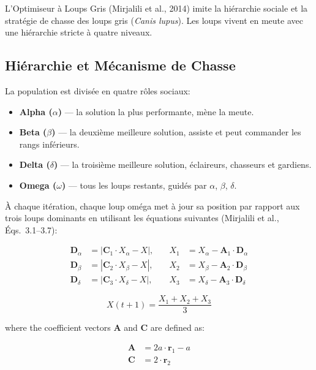\documentclass[12pt,a4paper,oneside]{report}
\begin{document}
L'Optimiseur \`a Loups Gris (Mirjalili et al., 2014) imite la hi\'erarchie sociale et la strat\'egie de chasse des loups gris (\textit{Canis lupus}). Les loups vivent en meute avec une hi\'erarchie stricte \`a quatre niveaux.

\subsection{Hi\'erarchie et M\'ecanisme de Chasse}

La population est divis\'ee en quatre r\^oles sociaux:

\begin{itemize}[itemsep=4pt]
    \item \textbf{Alpha ($\alpha$)} — la solution la plus performante, m\`ene la meute.
    \item \textbf{Beta ($\beta$)} — la deuxi\`eme meilleure solution, assiste et peut commander les rangs inf\'erieurs.
    \item \textbf{Delta ($\delta$)} — la troisi\`eme meilleure solution, \'eclaireurs, chasseurs et gardiens.
    \item \textbf{Omega ($\omega$)} — tous les loups restants, guid\'es par $\alpha$, $\beta$, $\delta$.
\end{itemize}

\`A chaque it\'eration, chaque loup om\'ega met \`a jour sa position par rapport aux trois loups dominants en utilisant les \'equations suivantes (Mirjalili et al., \'Eqs.\ 3.1--3.7):

\begin{align}
\mathbf{D}_\alpha &= |\mathbf{C}_1 \cdot X_\alpha - X|, \quad &X_1 &= X_\alpha - \mathbf{A}_1 \cdot \mathbf{D}_\alpha \label{eq:gwo-alpha} \\
\mathbf{D}_\beta  &= |\mathbf{C}_2 \cdot X_\beta  - X|, \quad &X_2 &= X_\beta  - \mathbf{A}_2 \cdot \mathbf{D}_\beta  \label{eq:gwo-beta}  \\
\mathbf{D}_\delta &= |\mathbf{C}_3 \cdot X_\delta - X|, \quad &X_3 &= X_\delta - \mathbf{A}_3 \cdot \mathbf{D}_\delta \label{eq:gwo-delta}
\end{align}

\begin{equation}\label{eq:gwo-update}
X(t+1) = \frac{X_1 + X_2 + X_3}{3}
\end{equation}

where the coefficient vectors $\mathbf{A}$ and $\mathbf{C}$ are defined as:

\begin{align}
\mathbf{A} &= 2a \cdot \mathbf{r}_1 - a \label{eq:gwo-A} \\
\mathbf{C} &= 2 \cdot \mathbf{r}_2 \label{eq:gwo-C}
\end{align}
\end{document}
